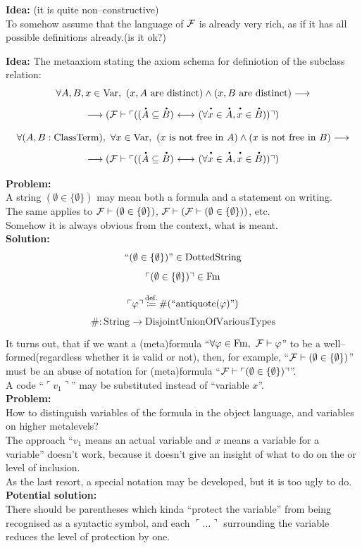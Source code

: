 \textbf{Idea:} (it is quite non--constructive)\\
To somehow assume that the language of ${\mathcal{F}}$ is already very rich, as if it has all possible definitions already.(is it ok?)

\textbf{Idea:}
The metaaxiom stating the axiom schema for definiotion of the subclass relation:
\[
\forall A,B,x\in \Var,\ %
(x,A\text{ are distinct})
\land
(x,B\text{ are distinct})
\implies
\]
\[
\implies 
(\Fau\vdash \ulcorner((\meta{A}\subclass \meta{B}) \iff (\forall \meta{x}\in \meta{A}, \meta{x}\in \meta{B}))\urcorner)
\]

\[
\forall (A,B:\ClassTerm),\ \forall x\in \Var,\ %
(x\text{ is not free in }A)
\land
(x\text{ is not free in }B)
\implies 
\]
\[
\implies 
(\Fau\vdash \ulcorner((\meta{A}\subclass \meta{B}) \iff (\forall \meta{x}\in \meta{A}, \meta{x}\in \meta{B}))\urcorner)
\]


\textbf{Problem:}\\
A string $(\emptyset\in \{\emptyset\})$ may mean both a formula and a statement on writing.\\
The same applies to ${\mathcal{F}}\vdash(\emptyset\in \{\emptyset\})$, ${\mathcal{F}}\vdash({\mathcal{F}}\vdash(\emptyset\in \{\emptyset\}))$, etc.\\
Somehow it is always obvious from the context, what is meant.\\
\textbf{Solution:}
\[
``(\emptyset\in \{\emptyset\})"\in\text{DottedString}
\]
\[
\ulcorner
(
\emptyset\in \{\emptyset\}
)
\urcorner
\in\mathrm{Fm}
\]

\[
\ulcorner\varphi\urcorner \,{\stackrel{{\textrm{def.}}}{\coloneqq}}\, \#(``\text{antiquote}(\varphi)")
\]
\[
\# : \text{String}\to \text{DisjointUnionOfVariousTypes}
\]

It turns out, that if we want a (meta)formula ``$\forall \varphi\in\mathrm{Fm},\  {\mathcal{F}}\vdash\varphi$'' to be a well--formed(regardless whether it is valid or not), then, for example, %
``${\mathcal{F}}\vdash (\emptyset\in \{\emptyset\})$'' must be an abuse of notation for (meta)formula ``${\mathcal{F}} \vdash \ulcorner(\emptyset\in \{\emptyset\})\urcorner$''.\\
A code ``$\ulcorner v_1\urcorner$'' may be substituted instead of ``variable $x$''.\\
\textbf{Problem:}\\
How to distinguish variables of the formula in the object language, and variables on higher metalevels?\\
The approach ``$v_1$ means an actual variable and $x$ means a variable for a variable'' doesn't work, because it doesn't give an insight of what to do on the  or  level of inclusion.\\
As the last resort, a special notation may be developed, but it is too ugly to do.\\
\textbf{Potential solution:}\\
There should be parentheses which kinda ``protect the variable'' from being recognised as a syntactic symbol, and each $\ulcorner \dots \urcorner$ surrounding the variable reduces the level of protection by one.

